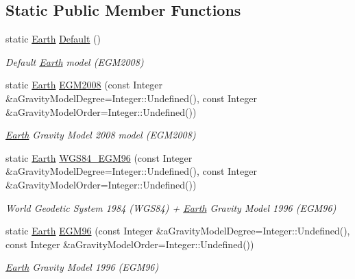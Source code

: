 \subsection*{Static Public Member Functions}
\begin{DoxyCompactItemize}
\item 
static \hyperlink{classostk_1_1physics_1_1env_1_1obj_1_1celest_1_1_earth}{Earth} \hyperlink{classostk_1_1physics_1_1env_1_1obj_1_1celest_1_1_earth_ab23224bee36577e7ab40576384ba8f2e}{Default} ()
\begin{DoxyCompactList}\small\item\em Default \hyperlink{classostk_1_1physics_1_1env_1_1obj_1_1celest_1_1_earth}{Earth} model (E\+G\+M2008) \end{DoxyCompactList}\item 
static \hyperlink{classostk_1_1physics_1_1env_1_1obj_1_1celest_1_1_earth}{Earth} \hyperlink{classostk_1_1physics_1_1env_1_1obj_1_1celest_1_1_earth_a41309c72eb9f74ecc37a502b00e89b9b}{E\+G\+M2008} (const Integer \&a\+Gravity\+Model\+Degree=Integer\+::\+Undefined(), const Integer \&a\+Gravity\+Model\+Order=Integer\+::\+Undefined())
\begin{DoxyCompactList}\small\item\em \hyperlink{classostk_1_1physics_1_1env_1_1obj_1_1celest_1_1_earth}{Earth} Gravity Model 2008 model (E\+G\+M2008) \end{DoxyCompactList}\item 
static \hyperlink{classostk_1_1physics_1_1env_1_1obj_1_1celest_1_1_earth}{Earth} \hyperlink{classostk_1_1physics_1_1env_1_1obj_1_1celest_1_1_earth_ae424f9430a33064680675a93825dcf8b}{W\+G\+S84\+\_\+\+E\+G\+M96} (const Integer \&a\+Gravity\+Model\+Degree=Integer\+::\+Undefined(), const Integer \&a\+Gravity\+Model\+Order=Integer\+::\+Undefined())
\begin{DoxyCompactList}\small\item\em World Geodetic System 1984 (W\+G\+S84) + \hyperlink{classostk_1_1physics_1_1env_1_1obj_1_1celest_1_1_earth}{Earth} Gravity Model 1996 (E\+G\+M96) \end{DoxyCompactList}\item 
static \hyperlink{classostk_1_1physics_1_1env_1_1obj_1_1celest_1_1_earth}{Earth} \hyperlink{classostk_1_1physics_1_1env_1_1obj_1_1celest_1_1_earth_a51931a35af7457fef1e23055d23646f2}{E\+G\+M96} (const Integer \&a\+Gravity\+Model\+Degree=Integer\+::\+Undefined(), const Integer \&a\+Gravity\+Model\+Order=Integer\+::\+Undefined())
\begin{DoxyCompactList}\small\item\em \hyperlink{classostk_1_1physics_1_1env_1_1obj_1_1celest_1_1_earth}{Earth} Gravity Model 1996 (E\+G\+M96) \end{DoxyCompactList}\item 

\end{DoxyCompactItemize}
